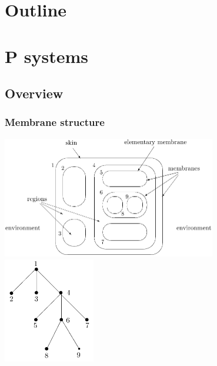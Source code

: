 \section*{Outline}
\begin{frame}
\tableofcontents
\end{frame}
\note{}

\section{P systems} %
\label{sec:p_systems}

  \subsection{Overview} %
  \label{sub:overview}

    \begin{frame}[t]\frametitle{Membrane structure}
      \includegraphics[width=0.7\textwidth]{membrane_structure.png}
      \hfill
      \includegraphics[width=0.3\textwidth]{membrane_tree.png}

    \end{frame}
    \note{}


